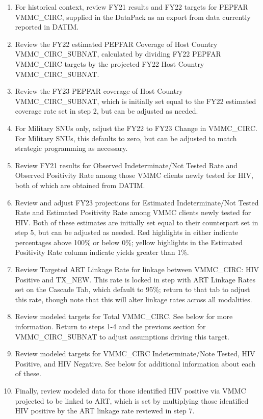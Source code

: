 \documentclass[
  openany]{book}
\begin{document}
\begin{enumerate}
\def\labelenumi{\arabic{enumi}.}
\item
  For historical context, review FY21 results and FY22 targets for
  PEPFAR VMMC\_CIRC, supplied in the DataPack as an export from data
  currently reported in DATIM.
\item
  Review the FY22 estimated PEPFAR Coverage of Host Country
  VMMC\_CIRC\_SUBNAT, calculated by dividing FY22 PEPFAR VMMC\_CIRC
  targets by the projected FY22 Host Country VMMC\_CIRC\_SUBNAT.
\item
  Review the FY23 PEPFAR coverage of Host Country VMMC\_CIRC\_SUBNAT,
  which is initially set equal to the FY22 estimated coverage rate set
  in step 2, but can be adjusted as needed.
\item
  For Military SNUs only, adjust the FY22 to FY23 Change in VMMC\_CIRC.
  For Military SNUs, this defaults to zero, but can be adjusted to
  match strategic programming as necessary.
\item
  Review FY21 results for Observed Indeterminate/Not Tested Rate and
  Observed Positivity Rate among those VMMC clients newly tested for
  HIV, both of which are obtained from DATIM.
\item
  Review and adjust FY23 projections for Estimated Indeterminate/Not
  Tested Rate and Estimated Positivity Rate among VMMC clients newly
  tested for HIV. Both of these estimates are initially set equal to
  their counterpart set in step 5, but can be adjusted as needed. Red
  highlights in either indicate percentages above 100\% or below 0\%;
  yellow highlights in the Estimated Positivity Rate column indicate
  yields greater than 1\%.
\item
  Review Targeted ART Linkage Rate for linkage between VMMC\_CIRC: HIV
  Positive and TX\_NEW. This rate is locked in step with ART Linkage
  Rates set on the Cascade Tab, which default to 95\%; return to that
  tab to adjust this rate, though note that this will alter linkage
  rates across all modalities.
\item
  Review modeled targets for Total VMMC\_CIRC. See below for more
  information. Return to steps 1-4 and the previous section for
  VMMC\_CIRC\_SUBNAT to adjust assumptions driving this target.
\item
  Review modeled targets for VMMC\_CIRC Indeterminate/Note Tested, HIV
  Positive, and HIV Negative. See below for additional information
  about each of these.
\item
  Finally, review modeled data for those identified HIV positive via
  VMMC projected to be linked to ART, which is set by multiplying
  those identified HIV positive by the ART linkage rate reviewed in
  step 7.
\end{enumerate}
\end{document}
